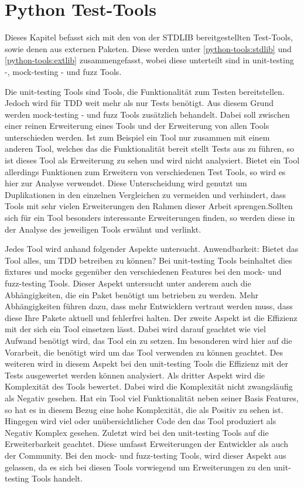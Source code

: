 \section{Python Test-Tools}\label{python-tools}

Dieses Kapitel befasst sich mit den von der STDLIB bereitgestellten Test-Tools,
sowie denen aus externen Paketen.
Diese werden unter \ref{python-tools:stdlib} und \ref{python-tools:extlib}
zusammengefasst, wobei diese unterteilt sind in unit-testing -,
\gls{mock}-testing - und \gls{fuzz} Tools.

Die unit-testing Tools sind Tools, die Funktionalität zum Testen bereitstellen.
Jedoch wird für TDD weit mehr als nur Tests benötigt. Aus diesem Grund werden
\gls{mock}-testing - und \gls{fuzz} Tools zusätzlich behandelt. Dabei soll
zwischen einer reinen Erweiterung eines Tools und der Erweiterung von allen Tools
unterschieden werden.
Ist zum Beispiel ein Tool nur zusammen mit einem anderen Tool, welches das die
Funktionalität bereit stellt Tests aus zu führen, so ist dieses Tool als
Erweiterung zu sehen und wird nicht analysiert. Bietet ein Tool allerdings
Funktionen zum Erweitern von verschiedenen Test Tools, so wird es hier zur 
Analyse verwendet. Diese Unterscheidung wird genutzt um Duplikationen
in den einzelnen Vergleichen zu vermeiden und verhindert, dass Tools mit sehr
vielen Erweiterungen den Rahmen dieser Arbeit sprengen.Sollten sich für ein Tool
besonders interessante Erweiterungen finden, so werden diese in der Analyse des
jeweiligen Tools erwähnt und verlinkt.
\newline

Jedes Tool wird anhand folgender Aspekte untersucht. Anwendbarkeit: Bietet das
Tool alles, um TDD betreiben zu können? Bei unit-testing Tools beinhaltet dies
\Glspl{fixture} und \Glspl{mock} gegenüber den verschiedenen Features bei den
\gls{mock}- und \gls{fuzz}-testing Tools. Dieser Aspekt untersucht unter anderem
auch die Abhängigkeiten, die ein Paket benötigt um betrieben zu werden. Mehr
Abhängigkeiten führen dazu, dass mehr Entwicklern vertraut werden muss, dass
diese Ihre Pakete aktuell und fehlerfrei halten.
Der zweite Aspekt ist die Effizienz mit der sich ein Tool einsetzen lässt. Dabei
wird darauf geachtet wie viel Aufwand benötigt wird, das Tool ein zu setzen. Im
besonderen wird hier auf die Vorarbeit, die benötigt wird um das Tool verwenden
zu können geachtet. Des weiteren wird in diesem Aspekt bei den unit-testing
Tools die Effizienz mit der Tests ausgewertet werden können analysiert.
Als dritter Aspekt wird die Komplexität des Tools bewertet. Dabei wird die
Komplexität nicht zwangsläufig als Negativ gesehen. Hat ein Tool viel
Funktionalität neben seiner Basis Features, so hat es in diesem Bezug eine hohe
Komplexität, die als Positiv zu sehen ist. Hingegen wird viel oder
unübersichtlicher Code den das Tool produziert als Negativ Komplex gesehen.
Zuletzt wird bei den unit-testing Tools auf die Erweiterbarkeit geachtet. Diese
umfasst Erweiterungen der Entwickler als auch der Community. Bei den mock- und
fuzz-testing Tools, wird dieser Aspekt aus gelassen, da es sich bei diesen Tools
vorwiegend um Erweiterungen zu den unit-testing Tools handelt.
\newline

